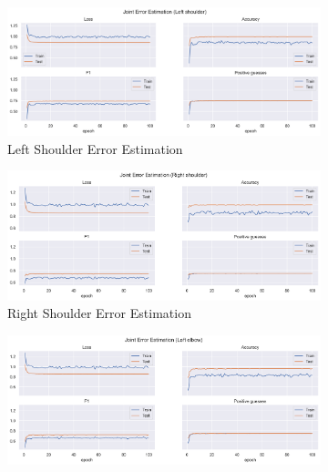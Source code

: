 \begin{figure}[!ht]
  \centering
  \begin{subfigure}[b]{0.47\linewidth}
      \centering
      \includegraphics[width=\textwidth]{figures/Results/v1_bs_60_is_64_e_100/jt/Left shoulder_ErrorEstimation.png}
      \caption{Left Shoulder Error Estimation}
      \label{fig:v1_lesh_jt_ee}
  \end{subfigure}
  \hfill
  \begin{subfigure}[b]{0.47\linewidth}
      \centering
      \includegraphics[width=\textwidth]{figures/Results/v1_bs_60_is_64_e_100/jt/Right shoulder_ErrorEstimation.png}
      \caption{Right Shoulder Error Estimation}
      \label{fig:v1_rish_jt_ee}
  \end{subfigure}
  \hfill
  \begin{subfigure}[b]{0.47\linewidth}
      \centering
      \includegraphics[width=\textwidth]{figures/Results/v1_bs_60_is_64_e_100/jt/Left elbow_ErrorEstimation.png}

\end{subfigure}
\end{figure}
